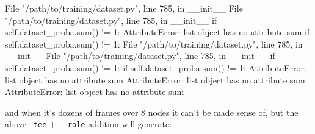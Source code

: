\documentclass[
]{report}
\newenvironment{Shaded}{\begin{snugshade}}{\end{snugshade}}
\newcommand{\ControlFlowTok}[1]{\textcolor[rgb]{0.00,0.23,0.31}{#1}}
\newcommand{\ExtensionTok}[1]{\textcolor[rgb]{0.00,0.23,0.31}{#1}}
\newcommand{\FunctionTok}[1]{\textcolor[rgb]{0.28,0.35,0.67}{#1}}
\newcommand{\NormalTok}[1]{\textcolor[rgb]{0.00,0.23,0.31}{#1}}
\newcommand{\StringTok}[1]{\textcolor[rgb]{0.13,0.47,0.30}{#1}}
\begin{document}
\begin{Shaded}
\begin{Highlighting}[]
  \ExtensionTok{File} \StringTok{"/path/to/training/dataset.py"}\NormalTok{, line 785, in \_\_init\_\_}
  \ExtensionTok{File} \StringTok{"/path/to/training/dataset.py"}\NormalTok{, line 785, in \_\_init\_\_}
    \ControlFlowTok{if} \FunctionTok{self.dataset\_proba.sum()} \ExtensionTok{!=}\NormalTok{ 1:}
\ExtensionTok{AttributeError:} \StringTok{\textquotesingle{}list\textquotesingle{}}\NormalTok{ object has no attribute }\StringTok{\textquotesingle{}sum\textquotesingle{}}
    \ControlFlowTok{if} \FunctionTok{self.dataset\_proba.sum()} \ExtensionTok{!=}\NormalTok{ 1:}
  \ExtensionTok{File} \StringTok{"/path/to/training/dataset.py"}\NormalTok{, line 785, in \_\_init\_\_}
  \ExtensionTok{File} \StringTok{"/path/to/training/dataset.py"}\NormalTok{, line 785, in \_\_init\_\_}
    \ControlFlowTok{if} \FunctionTok{self.dataset\_proba.sum()} \ExtensionTok{!=}\NormalTok{ 1:}
    \ControlFlowTok{if} \FunctionTok{self.dataset\_proba.sum()} \ExtensionTok{!=}\NormalTok{ 1:}
\ExtensionTok{AttributeError:} \StringTok{\textquotesingle{}list\textquotesingle{}}\NormalTok{ object has no attribute }\StringTok{\textquotesingle{}sum\textquotesingle{}}
\ExtensionTok{AttributeError:} \StringTok{\textquotesingle{}list\textquotesingle{}}\NormalTok{ object has no attribute }\StringTok{\textquotesingle{}sum\textquotesingle{}}
\ExtensionTok{AttributeError:} \StringTok{\textquotesingle{}list\textquotesingle{}}\NormalTok{ object has no attribute }\StringTok{\textquotesingle{}sum\textquotesingle{}}
\end{Highlighting}
\end{Shaded}

and when it's dozens of frames over 8 nodes it can't be made sense of,
but the above \texttt{-tee} + \texttt{-\/-role} addition will generate:
\end{document}
